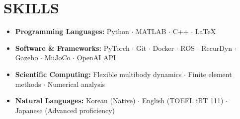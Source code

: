 \documentclass[a4paper,10pt]{extarticle}
\begin{document}
\section*{SKILLS}
\begin{itemize}
	\item \textbf{Programming Languages: }Python $\cdot$ MATLAB $\cdot$ C++ $\cdot$ \LaTeX
	\item \textbf{Software \& Frameworks: }PyTorch $\cdot$ Git $\cdot$ Docker $\cdot$ ROS $\cdot$ RecurDyn $\cdot$ Gazebo $\cdot$ MuJoCo $\cdot$ OpenAI API
	\item \textbf{Scientific Computing: }Flexible multibody dynamics $\cdot$ Finite element methods $\cdot$ Numerical analysis
	\item \textbf{Natural Languages: }Korean (Native) $\cdot$ English (TOEFL iBT 111) $\cdot$ Japanese (Advanced proficiency)
\end{itemize}

\setlength{\itemsep}{10pt} %
\end{document}
